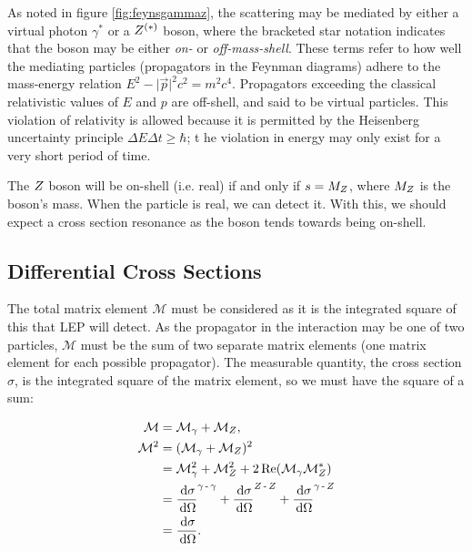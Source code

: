 \documentclass[]{article}
\begin{document}
As noted in figure \ref{fig:feynsgammaz}, the scattering may be mediated by either a virtual photon $\gamma^{*}$ or a $Z ^{(*)}$ boson, where the bracketed star notation indicates that the boson may be either \emph{on-} or \emph{off-mass-shell}. These terms refer to how well the mediating particles (propagators in the Feynman diagrams) adhere to the mass-energy relation $E^{2} - \lvert{\vec{p}}\rvert^{2}c^{2} = m^{2}c^{4}$. Propagators exceeding the classical relativistic values of $E$ and $p$ are off-shell, and said to be virtual particles. This violation of relativity is allowed because it is permitted by the Heisenberg uncertainty principle $\Delta E\Delta t \geq \hbar$; t he violation in energy may only exist for a very short period of time.

The $Z $ boson will be on-shell (i.e. real) if and only if $s = M_{Z }$, where $M_{Z }$ is the boson's mass. When the particle is real, we can detect it. With this, we should expect a cross section resonance as the boson tends towards being on-shell.

\subsection{Differential Cross Sections}

The total matrix element $\mathcal{M}$ must be considered as it is the integrated square of this that LEP will detect. As the propagator in the interaction may be one of two particles, $\mathcal{M}$ must be the sum of two separate matrix elements (one matrix element for each possible propagator). The measurable quantity, the cross section $\sigma$, is the integrated square of the matrix element, so we must have the square of a sum:

\begin{align*}
\mathcal{M} &= \mathcal{M}_{\gamma} + \mathcal{M}_{\Zzero},
\\
\mathcal{M}^{2} &= (\mathcal{M}_{\gamma} + \mathcal{M}_{\Zzero})^{2}
\\
&= \mathcal{M}_{\gamma}^{2} + \mathcal{M}_{\Zzero}^{2} + 2\operatorname{Re}(\mathcal{M}_{\gamma}\mathcal{M}_{\Zzero}^{*})
\\
&= \frac{\d{\sigma}}{\d{\Omega}}^{\gamma\operatorname{-}\gamma} +
	\frac{\d{\sigma}}{\d{\Omega}}^{\Zzero\operatorname{-}\Zzero} +
	\frac{\d{\sigma}}{\d{\Omega}}^{\gamma\operatorname{-}\Zzero}
\\
&= \frac{\d{\sigma}}{\d{\Omega}}.
\end{align*}
\end{document}

